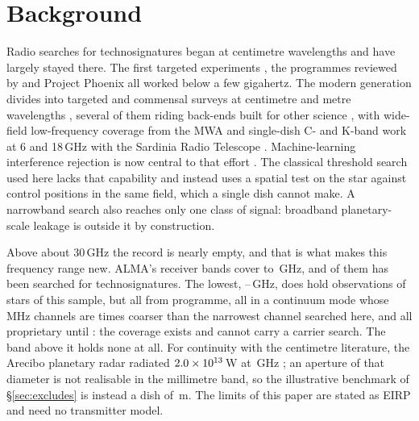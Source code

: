 \section{Background}
\label{sec:background}

Radio searches for technosignatures began at centimetre wavelengths and
have largely stayed there. The first targeted experiments
\citep{CocconiMorrison1959,Drake1960}, the programmes reviewed by
\citet{Tarter2001} and Project Phoenix \citep{Backus2002} all worked
below a few gigahertz. The modern generation divides into targeted and
commensal surveys at centimetre and metre wavelengths
\citep{Zhang2020,Czech2021,FAST3IATLAS2025,LOFARdualsite2023,Choza2024},
several of them riding back-ends built for other science
\citep{Morrison2023}, with wide-field low-frequency coverage from the MWA
\citep{Tremblay2024}
and single-dish C- and K-band work at 6 and 18\,GHz with the Sardinia
Radio Telescope \citep{SRT2025}. Machine-learning interference rejection
is now central to that effort
\citep{Ma2023,GLOBULAR2025,AnomalyParkesGBT2025}. The classical threshold
search used here lacks that capability and instead uses a spatial test on
the star against control positions in the same field, which a single dish
cannot make. A narrowband search also reaches only one class of signal:
broadband planetary-scale leakage \citep{BRaTs2026} is outside it by
construction.

Above about 30\,GHz the record is nearly empty, and that is what makes
this frequency range new. ALMA's \SbNBand{} receiver bands cover
\SbBandLoGHz{} to \SbBandHiGHz\,GHz, and \SbNPriorBandWord{} of them has
been searched for technosignatures. The lowest,
\SbBandOneLoGHz--\SbBandOneHiGHz\,GHz, does hold observations of
\SbBoneNStar{} stars of this sample, but all from \SbBoneNProgWord{}
programme, all in a
continuum mode whose \SbBoneChanMHz\,MHz channels are \SbBoneChanRatio{}
times coarser than the narrowest channel searched here, and all
proprietary until \SbBoneRelYear: the coverage exists and cannot carry a
carrier search. The band above it holds none at all. For continuity with
the centimetre literature, the Arecibo planetary radar radiated
$2.0\times10^{13}$\,W at \ArecGHz\,GHz \citep{EarthDetectingEarth2025}; an
aperture of that diameter is not realisable in the millimetre band, so the
illustrative benchmark of \S\ref{sec:excludes} is instead a dish of
\BenchDiam\,m. The limits of this paper are stated as EIRP and need no
transmitter model.

